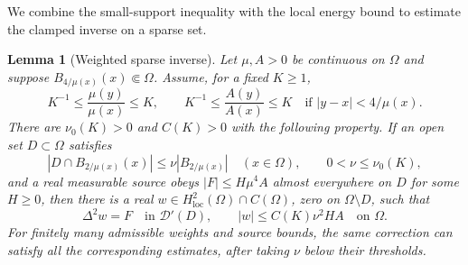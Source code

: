 \documentclass[11pt,twoside,leqno]{article}
\numberwithin{equation}{section}
\newtheorem{lemma}[theorem]{Lemma}
\theoremstyle{definition}
\theoremstyle{remark}
\newcommand{\loc}{\mathrm{loc}}
\newcommand{\Om}{\Omega}
\begin{document}
We combine the small-support inequality with the local energy bound
to estimate the clamped inverse on a sparse set.

\begin{lemma}[Weighted sparse inverse]\label{lem:inverse}
Let $\mu,A>0$ be continuous on $\Om$ and suppose
$B_{4/\mu(x)}(x)\Subset\Om$. Assume, for a fixed $K\ge1$,
\begin{equation}\label{eq:abstract-comparison}
 K^{-1}\le\frac{\mu(y)}{\mu(x)}\le K,\qquad
 K^{-1}\le\frac{A(y)}{A(x)}\le K
 \quad\text{if }|y-x|<4/\mu(x).
\end{equation}
There are $\nu_0(K)>0$ and $C(K)>0$ with the following property.
If an open set $D\subset\Om$ satisfies
\begin{equation}\label{eq:sparsity}
 |D\cap B_{2/\mu(x)}(x)|\le\nu|B_{2/\mu(x)}|\quad(x\in\Om),
 \qquad0<\nu\le\nu_0(K),
\end{equation}
and a real measurable source obeys $|F|\le H\mu^4A$ almost
everywhere on $D$ for some $H\ge0$, then there is a real
$w\in H^2_{\loc}(\Om)\cap C(\Om)$, zero on $\Om\setminus D$, such that
\begin{equation}\label{eq:inverse}
 \Delta^2w=F\quad\text{in }\mathcal D'(D),\qquad
 |w|\le C(K)\nu^2HA\quad\text{on }\Om.
\end{equation}
For finitely many admissible weights and source bounds, the same
correction can satisfy all the corresponding estimates, after taking
$\nu$ below their thresholds.
\end{lemma}
\end{document}
